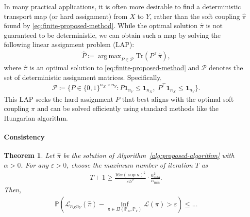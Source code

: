 \documentclass{article}
\newtheorem{theorem}{Theorem}
\DeclareMathOperator*{\argmax}{arg\,max}
\begin{document}
In many practical applications, it is often more desirable to find a deterministic transport map (or hard assignment) from $X$ to $Y$, rather than the soft coupling $\hat{\pi}$ found by \eqref{eq:finite-proposed-method}. While the optimal solution $\hat{\pi}$ is not guaranteed to be deterministic, we can obtain such a map by solving the following linear assignment problem (LAP):
\begin{align}
	\label{eq:finite-projection-method}
	\hat{P} \coloneqq \argmax_{P \in \mathcal{P}} \mathrm{Tr}(P^\top\hat{\pi}) ,
\end{align}
where $\hat{\pi}$ is an optimal solution to \eqref{eq:finite-proposed-method} and $\mathcal{P}$ denotes the set of deterministic assignment matrices. Specifically, 
\begin{align}
	\label{eq:assign-matrix-space}
	\mathcal{P} \coloneqq \{P \in \{0,1\}^{n_X \times n_Y}: P\mathbf{1}_{n_Y} \leq \mathbf{1}_{n_X}, \; P^\top\mathbf{1}_{n_X} \leq \mathbf{1}_{n_Y}\} .
\end{align}
This LAP seeks the hard assignment $P$ that best aligns with the optimal soft coupling $\hat{\pi}$ and can be solved efficiently using standard methods like the Hungarian algorithm.



\paragraph{Consistency}

\begin{theorem}
	\label{thm:consistency}
	Let $\hat{\pi}$ be the solution of Algorithm~\ref{alg:proposed-algorithm} with $\alpha > 0$. For any $\varepsilon > 0$, choose the maximum number of iteration $T$ as
	\begin{align*}
		T + 1 \geq \frac{16\alpha(\sup\kappa)^2}{\varepsilon h^2} \cdot \frac{n_{\max}^2}{n_{\min}} .
	\end{align*}
	Then,
	\begin{align*}
		\mathbb{P}\left(\mathcal{L}_{n_Xn_Y}(\hat{\pi}) - \inf_{\pi \in \Pi(\mathbb{P}_X,\mathbb{P}_Y)} \mathcal{L}(\pi) > \varepsilon \right) \leq ...
	\end{align*}
\end{theorem}
\end{document}
